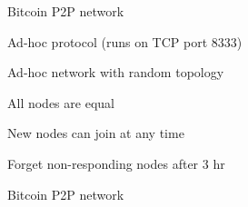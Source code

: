 \begin{frame}{Bitcoin P2P network}
	
\BIL
\item Ad-hoc protocol (runs on TCP port 8333)
\item Ad-hoc network with random topology
\item All nodes are equal
\item New nodes can join at any time
\item Forget non-responding nodes after 3 hr
\EIL	

\end{frame}

\begin{frame}{Bitcoin P2P network}
	

\end{frame}
